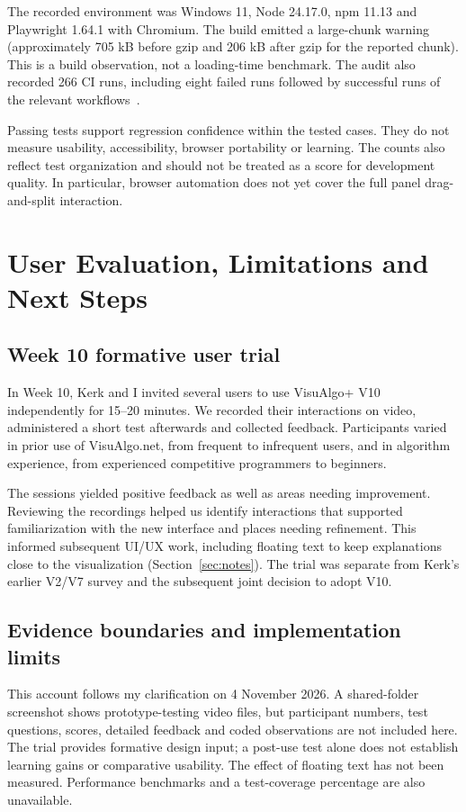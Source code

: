 \documentclass[11pt,a4paper]{article}
\newcommand{\page}{\par\vspace{8pt}}
\begin{document}
The recorded environment was Windows 11, Node 24.17.0, npm 11.13 and Playwright 1.64.1 with Chromium. The build emitted a large-chunk warning (approximately 705 kB before gzip and 206 kB after gzip for the reported chunk). This is a build observation, not a loading-time benchmark. The audit also recorded 266 CI runs, including eight failed runs followed by successful runs of the relevant workflows~\cite{validation}.

Passing tests support regression confidence within the tested cases. They do not measure usability, accessibility, browser portability or learning. The counts also reflect test organization and should not be treated as a score for development quality. In particular, browser automation does not yet cover the full panel drag-and-split interaction.

\page
\section{User Evaluation, Limitations and Next Steps}
\subsection{Week 10 formative user trial}
In Week 10, Kerk and I invited several users to use VisuAlgo+ V10 independently for 15--20 minutes. We recorded their interactions on video, administered a short test afterwards and collected feedback. Participants varied in prior use of VisuAlgo.net, from frequent to infrequent users, and in algorithm experience, from experienced competitive programmers to beginners.

The sessions yielded positive feedback as well as areas needing improvement. Reviewing the recordings helped us identify interactions that supported familiarization with the new interface and places needing refinement. This informed subsequent UI/UX work, including floating text to keep explanations close to the visualization (Section~\ref{sec:notes}). The trial was separate from Kerk's earlier V2/V7 survey and the subsequent joint decision to adopt V10.

\subsection{Evidence boundaries and implementation limits}
This account follows my clarification on 4 November 2026. A shared-folder screenshot shows prototype-testing video files, but participant numbers, test questions, scores, detailed feedback and coded observations are not included here. The trial provides formative design input; a post-use test alone does not establish learning gains or comparative usability. The effect of floating text has not been measured. Performance benchmarks and a test-coverage percentage are also unavailable.
\end{document}
